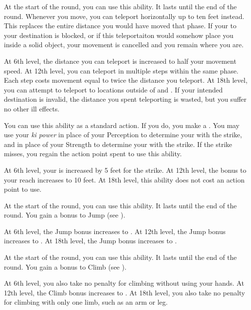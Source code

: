 {            
            At the start of the round, you can use this ability.
            It lasts until the end of the round.
            Whenever you move, you can teleport horizontally up to ten feet instead.
            This replaces the entire distance you would have moved that phase.
            If your  to your destination is blocked, or if this teleportaiton would somehow place you inside a solid object, your movement is cancelled and you remain where you are.
            \par At 6th level, the distance you can teleport is increased to half your movement speed.
            At 12th level, you can teleport in multiple steps within the same phase.
            Each step costs movement equal to twice the distance you teleport.
            At 18th level, you can attempt to teleport to locations outside of  and .
            If your intended destination is invalid, the distance you spent teleporting is wasted, but you suffer no other ill effects.

            You can use this ability as a standard action.
            If you do, you make a .
            You may use your \textit{ki power} in place of your Perception to determine your  with the strike, and in place of your Strength to determine your  with the strike.
            If the strike misses, you regain the action point spent to use this ability.
            \par At 6th level, your  is increased by 5 feet for the strike.
            At 12th level, the bonus to your reach increases to 10 feet. 
            At 18th level, this ability does not cost an action point to use.

            At the start of the round, you can use this ability.
            It lasts until the end of the round.
            You gain a  bonus to Jump (see ).
            \par At 6th level, the Jump bonus increases to .
            At 12th level, the Jump bonus increases to .
            At 18th level, the Jump bonus increases to .

            At the start of the round, you can use this ability.
            It lasts until the end of the round.
            You gain a  bonus to Climb (see ).
            \par At 6th level, you also take no penalty for climbing without using your hands.
            At 12th level, the Climb bonus increases to .
            At 18th level, you also take no penalty for climbing with only one limb, such as an arm or leg.

}
